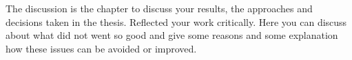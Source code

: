 The discussion is the chapter to discuss your results, the approaches and decisions taken in the thesis. Reflected your work critically. 
Here you can discuss about what did not went so good and give some reasons and some explanation how these issues can be avoided or improved. 
